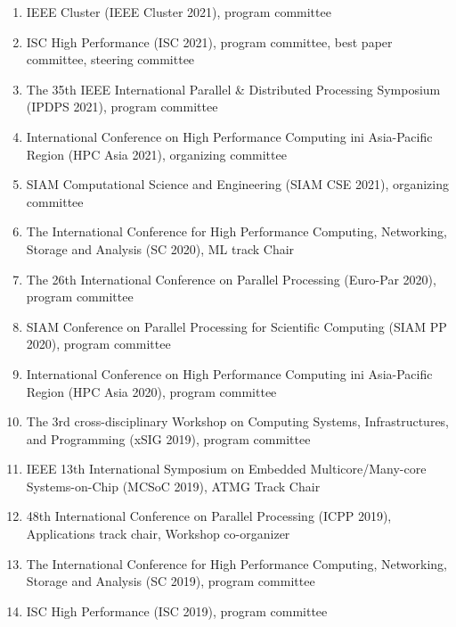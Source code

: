 \documentclass[margin,line]{cv}
\begin{document}
\begin{resume}
\begin{enumerate}
\item IEEE Cluster (IEEE Cluster 2021), program committee

\item ISC High Performance (ISC 2021), program committee, best paper committee, steering committee

\item The 35th IEEE International Parallel \& Distributed Processing Symposium (IPDPS 2021), program committee

\item International Conference on High Performance Computing ini Asia-Pacific Region (HPC Asia 2021), organizing committee

\item SIAM Computational Science and Engineering (SIAM CSE 2021), organizing committee

\item The International Conference for High Performance Computing, Networking, Storage and Analysis (SC 2020), ML track Chair

\item The 26th International Conference on Parallel Processing (Euro-Par 2020), program committee

\item SIAM Conference on Parallel Processing for Scientific Computing (SIAM PP 2020), program committee

\item International Conference on High Performance Computing ini Asia-Pacific Region (HPC Asia 2020), program committee

\item The 3rd cross-disciplinary Workshop on Computing Systems, Infrastructures, and Programming (xSIG 2019), program committee

\item IEEE 13th International Symposium on Embedded Multicore/Many-core Systems-on-Chip (MCSoC 2019), ATMG Track Chair

\item 48th International Conference on Parallel Processing (ICPP 2019), Applications track chair, Workshop co-organizer

\item The International Conference for High Performance Computing, Networking, Storage and Analysis (SC 2019), program committee

\item ISC High Performance (ISC 2019), program committee


\end{enumerate}
\end{resume}
\end{document}
